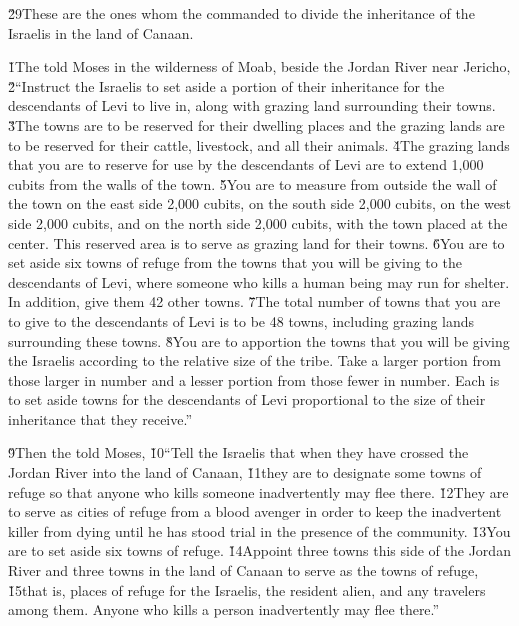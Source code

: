 \v{29}These are the ones whom the  commanded to divide the inheritance of the Israelis in the land of Canaan.

\v{1}The  told Moses in the wilderness of Moab, beside the Jordan River near Jericho, \v{2}``Instruct the Israelis to set aside a portion of their inheritance for the descendants of Levi to live in, along with grazing land surrounding their towns. \v{3}The towns are to be reserved for their dwelling places and the grazing lands are to be reserved for their cattle, livestock, and all their animals. \v{4}The grazing lands that you are to reserve for use by the descendants of Levi are to extend 1,000 cubits from the walls of the town. \v{5}You are to measure from outside the wall of the town on the east side 2,000 cubits, on the south side 2,000 cubits, on the west side 2,000 cubits, and on the north side 2,000 cubits, with the town placed at the center. This reserved area is to serve as grazing land for their towns. \v{6}You are to set aside six towns of refuge from the towns that you will be giving to the descendants of Levi, where someone who kills a human being may run for shelter. In addition, give them 42 other towns. \v{7}The total number of towns that you are to give to the descendants of Levi is to be 48 towns, including grazing lands surrounding these towns. \v{8}You are to apportion the towns that you will be giving the Israelis according to the relative size of the tribe. Take a larger portion from those larger in number and a lesser portion from those fewer in number. Each is to set aside towns for the descendants of Levi proportional to the size of their inheritance that they receive.''

\v{9}Then the  told Moses, \v{10}``Tell the Israelis that when they have crossed the Jordan River into the land of Canaan, \v{11}they are to designate some towns of refuge so that anyone who kills someone inadvertently may flee there. \v{12}They are to serve as cities of refuge from a blood avenger in order to keep the inadvertent killer from dying until he has stood trial in the presence of the community. \v{13}You are to set aside six towns of refuge. \v{14}Appoint three towns this side of the Jordan River and three towns in the land of Canaan to serve as the towns of refuge, \v{15}that is, places of refuge for the Israelis, the resident alien, and any travelers among them. Anyone who kills a person inadvertently may flee there.''

